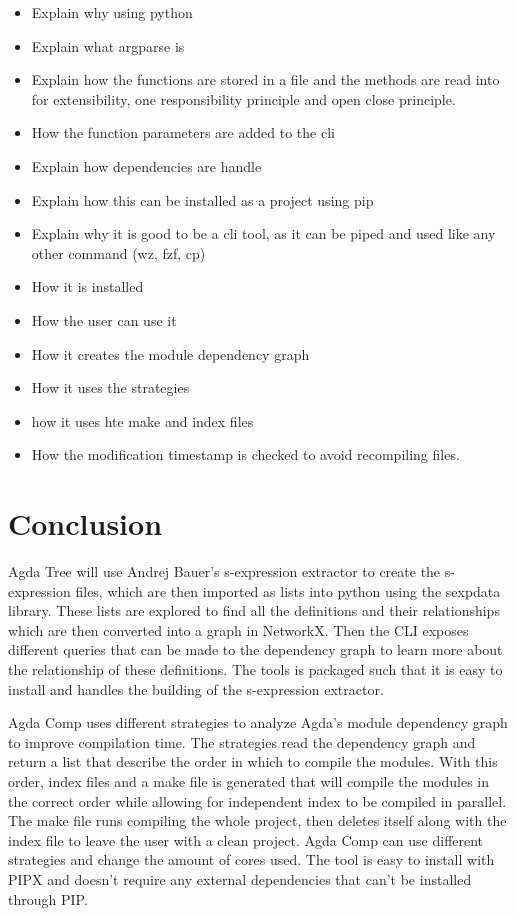 \begin{itemize}
\item Explain why using python
\item Explain what argparse is 
\item Explain how the functions are stored in a file and the methods are read into for extensibility, one responsibility principle and open close principle.
\item How the function parameters are added to the cli 
\item Explain how dependencies are handle 
\item Explain how this can be installed as a project using pip 
\item Explain why it is good to be a cli tool, as it can be piped and used like any other command (wz, fzf, cp) 
\item How it is installed 
\item How the user can use it
\item How it creates the module dependency graph
\item How it uses the strategies
\item how it uses hte make and index files
\item How the modification timestamp is checked to avoid recompiling files.
\end{itemize}

\section{Conclusion}

Agda Tree will use Andrej Bauer's s-expression extractor to create the
s-expression files, which are then imported as lists into python using the
sexpdata library. These lists are explored to find all the definitions and
their relationships which are then converted into a graph in NetworkX.  Then
the CLI exposes different queries that can be made to the dependency graph to
learn more about the relationship of these definitions. The tools is packaged
such that it is easy to install and handles the building of the s-expression
extractor.

Agda Comp uses different strategies to analyze Agda's module dependency graph
to improve compilation time. The strategies read the dependency graph and
return a list that describe the order in which to compile the modules. With
this order, index files and a make file is generated that will compile the
modules in the correct order while allowing for independent index to be
compiled in parallel. The make file runs compiling the whole project, then
deletes itself along with the index file to leave the user with a clean
project. Agda Comp can use different strategies and change the amount of cores
used. The tool is easy to install with PIPX and doesn't require any external
dependencies that can't be installed through PIP.



